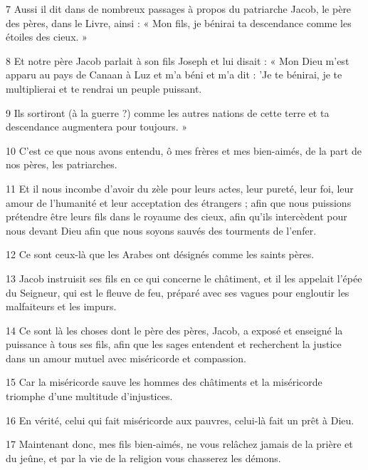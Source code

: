 \par 7 Aussi il dit dans de nombreux passages à propos du patriarche Jacob, le père des pères, dans le Livre, ainsi : « Mon fils, je bénirai ta descendance comme les étoiles des cieux. »

\par 8 Et notre père Jacob parlait à son fils Joseph et lui disait : « Mon Dieu m'est apparu au pays de Canaan à Luz et m'a béni et m'a dit : 'Je te bénirai, je te multiplierai et te rendrai un peuple puissant.

\par 9 Ils sortiront (à la guerre ?) comme les autres nations de cette terre et ta descendance augmentera pour toujours. »

\par 10 C'est ce que nous avons entendu, ô mes frères et mes bien-aimés, de la part de nos pères, les patriarches.

\par 11 Et il nous incombe d'avoir du zèle pour leurs actes, leur pureté, leur foi, leur amour de l'humanité et leur acceptation des étrangers ; afin que nous puissions prétendre être leurs fils dans le royaume des cieux, afin qu'ils intercèdent pour nous devant Dieu afin que nous soyons sauvés des tourments de l'enfer.

\par 12 Ce sont ceux-là que les Arabes ont désignés comme les saints pères.

\par 13 Jacob instruisit ses fils en ce qui concerne le châtiment, et il les appelait l'épée du Seigneur, qui est le fleuve de feu, préparé avec ses vagues pour engloutir les malfaiteurs et les impurs.

\par 14 Ce sont là les choses dont le père des pères, Jacob, a exposé et enseigné la puissance à tous ses fils, afin que les sages entendent et recherchent la justice dans un amour mutuel avec miséricorde et compassion.

\par 15 Car la miséricorde sauve les hommes des châtiments et la miséricorde triomphe d'une multitude d'injustices.

\par 16 En vérité, celui qui fait miséricorde aux pauvres, celui-là fait un prêt à Dieu.

\par 17 Maintenant donc, mes fils bien-aimés, ne vous relâchez jamais de la prière et du jeûne, et par la vie de la religion vous chasserez les démons.

